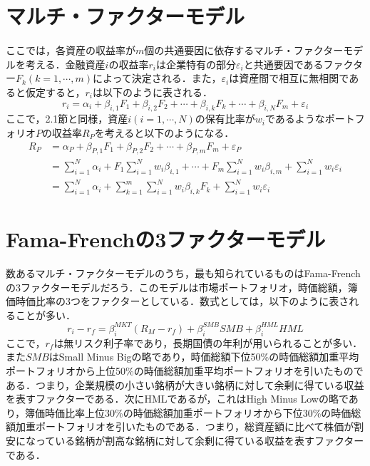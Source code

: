\documentclass[11pt]{jreport}
\begin{document}
\section{マルチ・ファクターモデル}
ここでは，各資産の収益率が$m$個の共通要因に依存するマルチ・ファクターモデルを考える．金融資産$i$の収益率$r_i$は企業特有の部分$\varepsilon_i$と共通要因であるファクター$F_k(k=1,\cdots,m)$によって決定される．また，$\varepsilon_i$は資産間で相互に無相関であると仮定すると，$r_i$は以下のように表される．
\begin{equation}
r_i = \alpha_i + \beta_{i,1}F_1 + \beta_{i,2}F_2 + \cdots + \beta_{i,k}F_k + \cdots + \beta_{i,N}F_m + \varepsilon_i
\end{equation}
ここで，2.1節と同様，資産$i(i=1,\cdots,N)$の保有比率が$w_i$であるようなポートフォリオ$P$の収益率$R_P$を考えると以下のようになる．
\begin{equation}
\begin{split}
R_P &= \alpha_P + \beta_{P,1} F_1 + \beta_{P,2} F_2 + \cdots + \beta_{P,m} F_m + \varepsilon_P\\
&=\sum_{i=1}^N \alpha_i + F_1 \sum_{i=1}^N w_i \beta_{i,1} + \cdots + F_m \sum_{i=1}^N w_i \beta_{i,m} + \sum_{i=1}^N w_i\varepsilon_i\\
&= \sum_{i=1}^N \alpha_i + \sum_{k=1}^m \sum_{i=1}^N w_i \beta_{i,k} F_k + \sum_{i=1}^N w_i\varepsilon_i
\label{eq:multi}
\end{split}
\end{equation}

\section{Fama-Frenchの3ファクターモデル}
数あるマルチ・ファクターモデルのうち，最も知られているものはFama-Frenchの3ファクターモデルだろう．このモデルは市場ポートフォリオ，時価総額，簿価時価比率の3つをファクターとしている．数式としては，以下のように表されることが多い．
\begin{equation}
r_i - r_f = \beta_i^{MKT}(R_M - r_f) + \beta_i^{SMB}SMB + \beta_i^{HML}HML
\label{eq:fama-french}
\end{equation}
ここで，$r_f$は無リスク利子率であり，長期国債の年利が用いられることが多い．また$SMB$はSmall Minus Bigの略であり，時価総額下位50\%の時価総額加重平均ポートフォリオから上位50\%の時価総額加重平均ポートフォリオを引いたものである．つまり，企業規模の小さい銘柄が大きい銘柄に対して余剰に得ている収益を表すファクターである．次にHMLであるが，これはHigh Minus Lowの略であり，簿価時価比率上位30\%の時価総額加重ポートフォリオから下位30\%の時価総額加重ポートフォリオを引いたものである．つまり，総資産額に比べて株価が割安になっている銘柄が割高な銘柄に対して余剰に得ている収益を表すファクターである．
\end{document}
